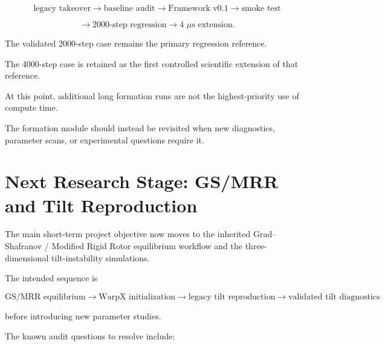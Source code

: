 \documentclass[11pt,a4paper]{article}
\begin{document}
\[
\text{legacy takeover}
\rightarrow
\text{baseline audit}
\rightarrow
\text{Framework v0.1}
\rightarrow
\text{smoke test}
\]

\[
\rightarrow
\text{2000-step regression}
\rightarrow
\text{4~$\mu$s extension}.
\]

The validated 2000-step case remains the primary regression reference.

The 4000-step case is retained as the first controlled scientific extension of
that reference.

At this point, additional long formation runs are not the highest-priority use
of compute time.

The formation module should instead be revisited when new diagnostics,
parameter scans, or experimental questions require it.

\section{Next Research Stage: GS/MRR and Tilt Reproduction}

The main short-term project objective now moves to the inherited
Grad--Shafranov / Modified Rigid Rotor equilibrium workflow and the
three-dimensional tilt-instability simulations.

The intended sequence is

\[
\boxed{
\text{GS/MRR equilibrium}
\rightarrow
\text{WarpX initialization}
\rightarrow
\text{legacy tilt reproduction}
\rightarrow
\text{validated tilt diagnostics}
}
\]

before introducing new parameter studies.

The known audit questions to resolve include:
\end{document}
